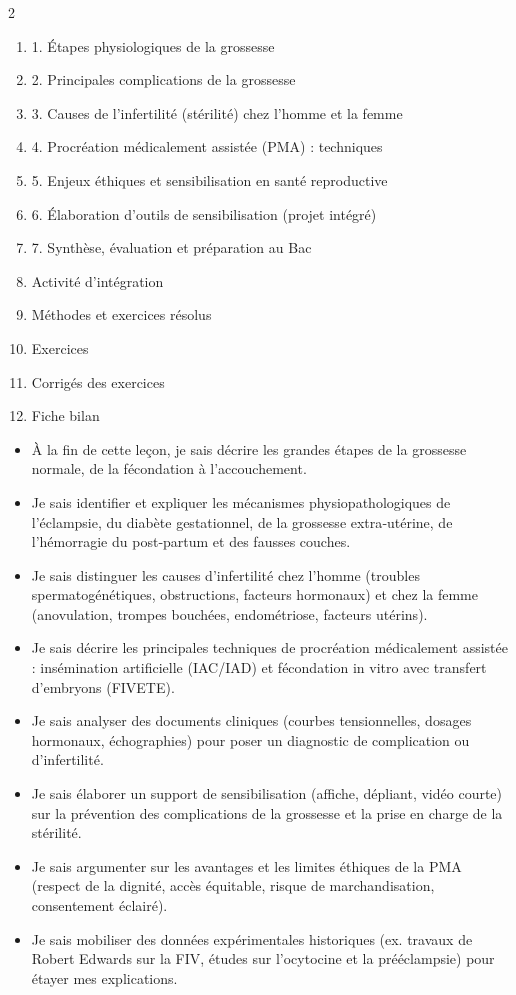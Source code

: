 \documentclass[11pt]{article}
\begin{document}
\begin{sommaire}
\begin{multicols}{2}
\begin{enumerate}
\item 1. Étapes physiologiques de la grossesse
\item 2. Principales complications de la grossesse
\item 3. Causes de l'infertilité (stérilité) chez l'homme et la femme
\item 4. Procréation médicalement assistée (PMA) : techniques
\item 5. Enjeux éthiques et sensibilisation en santé reproductive
\item 6. Élaboration d'outils de sensibilisation (projet intégré)
\item 7. Synthèse, évaluation et préparation au Bac
\item Activité d'intégration
\item Méthodes et exercices résolus
\item Exercices
\item Corrigés des exercices
\item Fiche bilan
\end{enumerate}
\end{multicols}
\end{sommaire}

\begin{objectifs}
\begin{itemize}
\item À la fin de cette leçon, je sais décrire les grandes étapes de la grossesse normale, de la fécondation à l'accouchement.
\item Je sais identifier et expliquer les mécanismes physiopathologiques de l'éclampsie, du diabète gestationnel, de la grossesse extra‑utérine, de l'hémorragie du post‑partum et des fausses couches.
\item Je sais distinguer les causes d'infertilité chez l'homme (troubles spermatogénétiques, obstructions, facteurs hormonaux) et chez la femme (anovulation, trompes bouchées, endométriose, facteurs utérins).
\item Je sais décrire les principales techniques de procréation médicalement assistée : insémination artificielle (IAC/IAD) et fécondation in vitro avec transfert d'embryons (FIVETE).
\item Je sais analyser des documents cliniques (courbes tensionnelles, dosages hormonaux, échographies) pour poser un diagnostic de complication ou d'infertilité.
\item Je sais élaborer un support de sensibilisation (affiche, dépliant, vidéo courte) sur la prévention des complications de la grossesse et la prise en charge de la stérilité.
\item Je sais argumenter sur les avantages et les limites éthiques de la PMA (respect de la dignité, accès équitable, risque de marchandisation, consentement éclairé).
\item Je sais mobiliser des données expérimentales historiques (ex. travaux de Robert Edwards sur la FIV, études sur l'ocytocine et la prééclampsie) pour étayer mes explications.
\end{itemize}
\end{objectifs}
\end{document}

